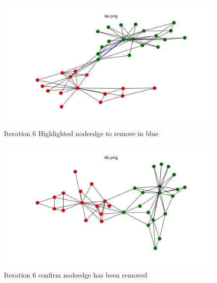\documentclass[12pt]{article}
\begin{document}
\begin{figure}[H]
\centering
\includegraphics[trim=0 0 0 0, clip, width=\textwidth] {6a.png}
\caption{Iteration 6 Highlighted nodeedge to remove in blue }
\label{fig:q16a}
\end{figure}
\begin{figure}[H]
\centering
\includegraphics[trim=0 0 0 0, clip, width=\textwidth] {6b.png}
\caption{Iteration 6 confirm nodeedge has been removed }
\label{fig:q16b}
\end{figure}
\end{document}
